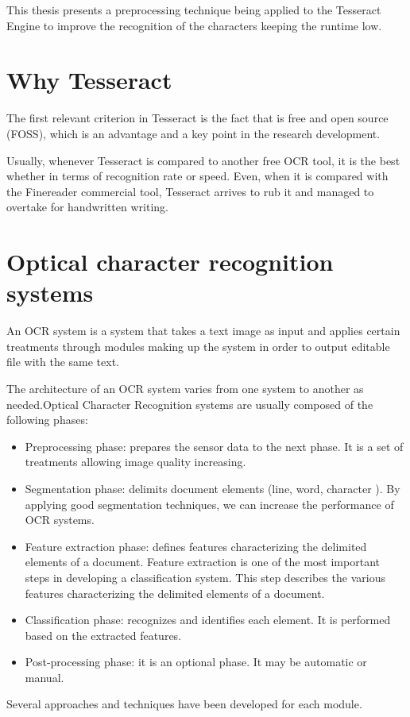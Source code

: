 This thesis presents a preprocessing technique being applied to the Tesseract Engine to improve the recognition of the characters keeping the runtime low.

\section{Why Tesseract}
The first relevant criterion in Tesseract is the fact that is free and open source (FOSS), which is an advantage and a key point in the research development.

Usually, whenever Tesseract is compared to another free OCR tool, it is the best whether in terms of recognition rate or speed. Even, when it is compared with the Finereader commercial tool, Tesseract arrives to rub it and managed to overtake for handwritten writing.

\section{Optical character recognition systems}
An OCR system is a system that takes a text image as input and applies certain treatments through modules making up the system in order to output editable file with the same text.

The architecture of an OCR system varies from one system to another as needed.Optical Character Recognition systems are usually composed of the following phases:

\begin{itemize}
\item Preprocessing phase: prepares the sensor data to the next phase. It is a set of treatments allowing image quality increasing.
\item Segmentation phase: delimits document elements (line, word, character ). By applying good segmentation techniques, we can increase the performance of OCR systems.
\item Feature extraction phase: defines features characterizing the delimited elements of a document. Feature extraction is one of the most important steps in developing a classification system. This step describes the various features characterizing the delimited elements of a document.
\item Classification phase: recognizes and identifies each element. It is performed based on the extracted features.
\item Post-processing phase: it is an optional phase. It may be automatic or manual.
\end{itemize}
Several approaches and techniques have been developed for each module.